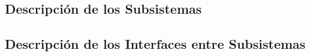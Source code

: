 
\subsection{Descripción de los Subsistemas} 

\subsection{Descripción de los Interfaces entre Subsistemas}
